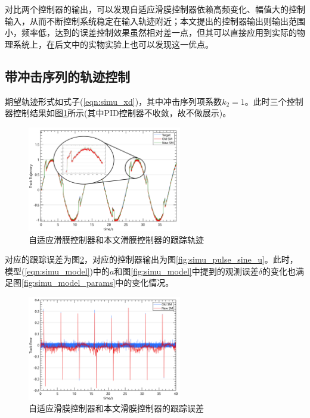 对比两个控制器的输出，可以发现自适应滑膜控制器依赖高频变化、幅值大的控制输入，从而不断控制系统稳定在输入轨迹附近；本文提出的控制器输出则输出范围小，频率低，达到的误差控制效果虽然相对差一点，但其可以直接应用到实际的物理系统上，在后文中的实物实验上也可以发现这一优点。
\FloatBarrier
\subsection{带冲击序列的轨迹控制}

期望轨迹形式如式子(\ref{eqn:simu_xd})，其中冲击序列项系数$k_2=1$。此时三个控制器控制结果如图\ref{fig:simu_pulse_sine_trajectory}所示(其中PID控制器不收敛，故不做展示)。

\begin{figure}[H]
    \centering
    \includegraphics[width=0.6\textwidth]{imgs/simu_pulse_sine_track.png}
    \caption{自适应滑膜控制器和本文滑膜控制器的跟踪轨迹}
    \label{fig:simu_pulse_sine_trajectory}
\end{figure}

对应的跟踪误差为图\ref{fig:simu_pulse_sine_error}，对应的控制器输出为图\ref{fig:simu_pulse_sine_u}。此时，模型(\ref{eqn:simu_model})中的$a$和图\ref{fig:simu_model}中提到的观测误差$\delta$的变化也满足图\ref{fig:simu_model_params}中的变化情况。

\begin{figure}[H]
    \centering
    \includegraphics[width=0.6\textwidth]{imgs/simu_pulse_sine_error.png}
    \caption{自适应滑膜控制器和本文滑膜控制器的跟踪误差}
    \label{fig:simu_pulse_sine_error}
\end{figure}

